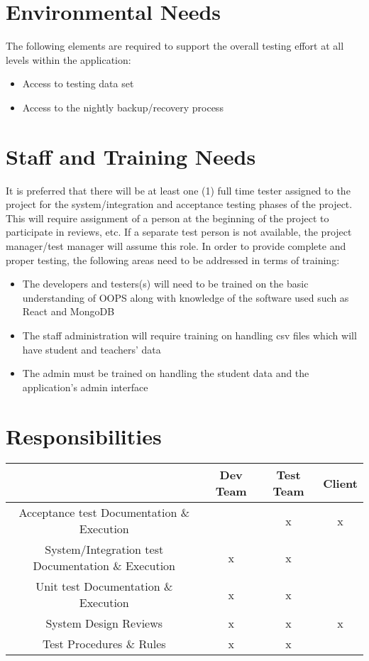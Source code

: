 \documentclass{scrreprt}
\begin{document}
\chapter{Environmental Needs}
The following elements are required to support the overall testing effort at all levels within the application:
\begin{itemize}
    \item Access to testing data set 
    \item Access to the nightly backup/recovery process
\end{itemize}

\chapter{Staff and Training Needs}
It is preferred that there will be at least one (1) full time tester assigned to the project for the system/integration and acceptance testing phases of the project. This will require assignment of a person at the beginning of the project to participate in reviews, etc. If a separate test person is not available, the project manager/test manager will assume this role.
In order to provide complete and proper testing, the following areas need to be addressed in terms of training:
\begin{itemize}
    \item The developers and testers(s) will need to be trained on the basic understanding of OOPS along with knowledge of the software used such as React and MongoDB
    \item The staff administration will require training on handling csv files which will have student and teachers’ data
    \item The admin must be trained on handling the student data and the application’s admin interface
\end{itemize}

\chapter{Responsibilities}
\begin{center}
\begin{tabular}{|c c c c|} 
 \hline
   & Dev Team & Test Team & Client \\ [0.5ex] 
 \hline
 Acceptance test Documentation \& Execution  &  & x & x \\ 
 \hline
 System/Integration test Documentation \& Execution & x & x &  \\
 \hline
 Unit test Documentation \& Execution & x & x &  \\
 \hline
 System Design Reviews & x & x & x \\
 \hline
 Test Procedures \& Rules & x & x &  \\ [1ex] 
 \hline
\end{tabular}
\end{center}
\end{document}
